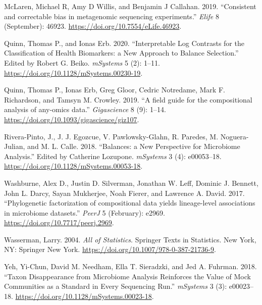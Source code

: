 \documentclass[
]{article}
\newlength{\cslhangindent}
\newlength{\cslentryspacingunit} %
\newenvironment{CSLReferences}[2] %
 {%
  \setlength{\parindent}{0pt}
  \ifodd #1
  \let\oldpar\par
  \def\par{\hangindent=\cslhangindent\oldpar}
  \fi
  \setlength{\parskip}{#2\cslentryspacingunit}
 }%
 {}
\theoremstyle{definition}
\theoremstyle{definition}
\theoremstyle{definition}
\theoremstyle{definition}
\theoremstyle{remark}
\begin{document}
\begin{CSLReferences}{1}{0}
\leavevmode{}%
McLaren, Michael R, Amy D Willis, and Benjamin J Callahan. 2019. {``{Consistent and correctable bias in metagenomic sequencing experiments}.''} \emph{Elife} 8 (September): 46923. \url{https://doi.org/10.7554/eLife.46923}.

\leavevmode{}%
Quinn, Thomas P., and Ionas Erb. 2020. {``{Interpretable Log Contrasts for the Classification of Health Biomarkers: a New Approach to Balance Selection}.''} Edited by Robert G. Beiko. \emph{mSystems} 5 (2): 1--11. \url{https://doi.org/10.1128/mSystems.00230-19}.

\leavevmode{}%
Quinn, Thomas P., Ionas Erb, Greg Gloor, Cedric Notredame, Mark F. Richardson, and Tamsyn M. Crowley. 2019. {``{A field guide for the compositional analysis of any-omics data}.''} \emph{Gigascience} 8 (9): 1--14. \url{https://doi.org/10.1093/gigascience/giz107}.

\leavevmode{}%
Rivera-Pinto, J., J. J. Egozcue, V. Pawlowsky-Glahn, R. Paredes, M. Noguera-Julian, and M. L. Calle. 2018. {``{Balances: a New Perspective for Microbiome Analysis}.''} Edited by Catherine Lozupone. \emph{mSystems} 3 (4): e00053--18. \url{https://doi.org/10.1128/mSystems.00053-18}.

\leavevmode{}%
Washburne, Alex D., Justin D. Silverman, Jonathan W. Leff, Dominic J. Bennett, John L. Darcy, Sayan Mukherjee, Noah Fierer, and Lawrence A. David. 2017. {``{Phylogenetic factorization of compositional data yields lineage-level associations in microbiome datasets}.''} \emph{PeerJ} 5 (February): e2969. \url{https://doi.org/10.7717/peerj.2969}.

\leavevmode{}%
Wasserman, Larry. 2004. \emph{{All of Statistics}}. Springer Texts in Statistics. New York, NY: Springer New York. \url{https://doi.org/10.1007/978-0-387-21736-9}.

\leavevmode{}%
Yeh, Yi-Chun, David M. Needham, Ella T. Sieradzki, and Jed A. Fuhrman. 2018. {``{Taxon Disappearance from Microbiome Analysis Reinforces the Value of Mock Communities as a Standard in Every Sequencing Run}.''} \emph{mSystems} 3 (3): e00023--18. \url{https://doi.org/10.1128/mSystems.00023-18}.

\end{CSLReferences}
\end{document}
